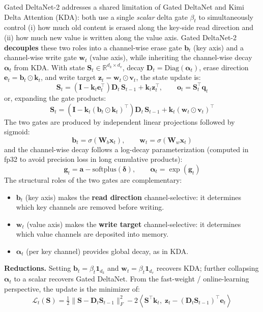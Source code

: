 Gated DeltaNet-2 \citep{hatamizadeh_gated_deltanet2_2026} addresses a shared limitation of Gated DeltaNet and Kimi Delta Attention (KDA): both use a single \emph{scalar} delta gate $\beta_t$ to simultaneously control (i) how much old content is erased along the key-side read direction and (ii) how much new value is written along the value axis. Gated DeltaNet-2 \textbf{decouples} these two roles into a channel-wise erase gate $\mathbf{b}_t$ (key axis) and a channel-wise write gate $\mathbf{w}_t$ (value axis), while inheriting the channel-wise decay $\boldsymbol{\alpha}_t$ from KDA. With state $\mathbf{S}_t \in \mathbb{R}^{d_k \times d_v}$, decay $\mathbf{D}_t = \mathrm{Diag}(\boldsymbol{\alpha}_t)$, erase direction $\mathbf{e}_t = \mathbf{b}_t \odot \mathbf{k}_t$, and write target $\mathbf{z}_t = \mathbf{w}_t \odot \mathbf{v}_t$, the state update is:
\[
\mathbf{S}_t = \left(\mathbf{I} - \mathbf{k}_t \mathbf{e}_t^\top\right) \mathbf{D}_t \, \mathbf{S}_{t-1} + \mathbf{k}_t \mathbf{z}_t^\top, \qquad \mathbf{o}_t = \mathbf{S}_t^\top \mathbf{q}_t
\]
or, expanding the gate products:
\[
\mathbf{S}_t = \left(\mathbf{I} - \mathbf{k}_t (\mathbf{b}_t \odot \mathbf{k}_t)^\top\right) \mathbf{D}_t \, \mathbf{S}_{t-1} + \mathbf{k}_t (\mathbf{w}_t \odot \mathbf{v}_t)^\top
\]
The two gates are produced by independent linear projections followed by sigmoid:
\[
\mathbf{b}_t = \sigma(\mathbf{W}_b \mathbf{x}_t), \qquad \mathbf{w}_t = \sigma(\mathbf{W}_w \mathbf{x}_t)
\]
and the channel-wise decay follows a log-decay parameterization (computed in fp32 to avoid precision loss in long cumulative products):
\[
\mathbf{g}_t = \mathbf{a} - \mathrm{softplus}(\boldsymbol{\delta}), \qquad \boldsymbol{\alpha}_t = \exp(\mathbf{g}_t)
\]
The structural roles of the two gates are complementary:
\begin{itemize}[leftmargin=*]
    \item $\mathbf{b}_t$ (key axis) makes the \textbf{read direction} channel-selective: it determines which key channels are removed before writing.
    \item $\mathbf{w}_t$ (value axis) makes the \textbf{write target} channel-selective: it determines which value channels are deposited into memory.
    \item $\boldsymbol{\alpha}_t$ (per key channel) provides global decay, as in KDA.
\end{itemize}
\textbf{Reductions.} Setting $\mathbf{b}_t = \beta_t \mathbf{1}_{d_k}$ and $\mathbf{w}_t = \beta_t \mathbf{1}_{d_v}$ recovers KDA; further collapsing $\boldsymbol{\alpha}_t$ to a scalar recovers Gated DeltaNet. From the fast-weight / online-learning perspective, the update is the minimizer of:
\[
\mathcal{L}_t(\mathbf{S}) = \tfrac{1}{2}\|\mathbf{S} - \mathbf{D}_t \mathbf{S}_{t-1}\|_F^2 - 2\left\langle \mathbf{S}^\top \mathbf{k}_t,\; \mathbf{z}_t - (\mathbf{D}_t \mathbf{S}_{t-1})^\top \mathbf{e}_t \right\rangle
\]

